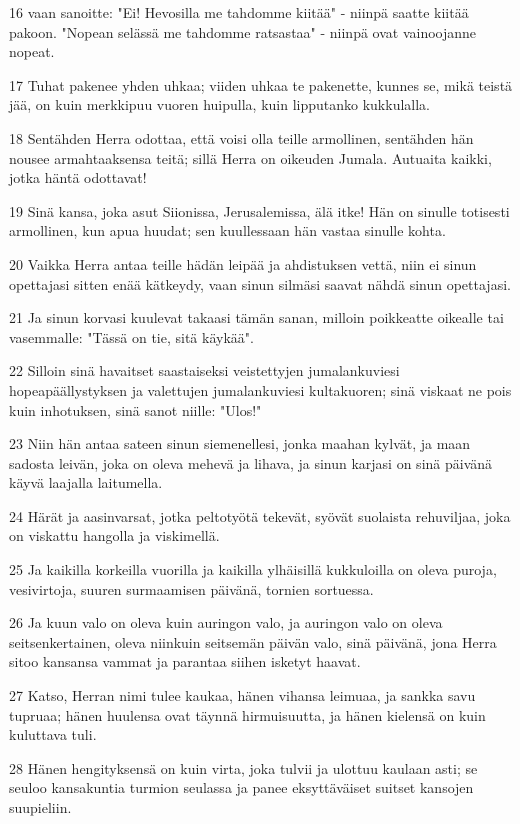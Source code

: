 \par 16 vaan sanoitte: "Ei! Hevosilla me tahdomme kiitää" - niinpä saatte kiitää pakoon. "Nopean selässä me tahdomme ratsastaa" - niinpä ovat vainoojanne nopeat.
\par 17 Tuhat pakenee yhden uhkaa; viiden uhkaa te pakenette, kunnes se, mikä teistä jää, on kuin merkkipuu vuoren huipulla, kuin lipputanko kukkulalla.
\par 18 Sentähden Herra odottaa, että voisi olla teille armollinen, sentähden hän nousee armahtaaksensa teitä; sillä Herra on oikeuden Jumala. Autuaita kaikki, jotka häntä odottavat!
\par 19 Sinä kansa, joka asut Siionissa, Jerusalemissa, älä itke! Hän on sinulle totisesti armollinen, kun apua huudat; sen kuullessaan hän vastaa sinulle kohta.
\par 20 Vaikka Herra antaa teille hädän leipää ja ahdistuksen vettä, niin ei sinun opettajasi sitten enää kätkeydy, vaan sinun silmäsi saavat nähdä sinun opettajasi.
\par 21 Ja sinun korvasi kuulevat takaasi tämän sanan, milloin poikkeatte oikealle tai vasemmalle: "Tässä on tie, sitä käykää".
\par 22 Silloin sinä havaitset saastaiseksi veistettyjen jumalankuviesi hopeapäällystyksen ja valettujen jumalankuviesi kultakuoren; sinä viskaat ne pois kuin inhotuksen, sinä sanot niille: "Ulos!"
\par 23 Niin hän antaa sateen sinun siemenellesi, jonka maahan kylvät, ja maan sadosta leivän, joka on oleva mehevä ja lihava, ja sinun karjasi on sinä päivänä käyvä laajalla laitumella.
\par 24 Härät ja aasinvarsat, jotka peltotyötä tekevät, syövät suolaista rehuviljaa, joka on viskattu hangolla ja viskimellä.
\par 25 Ja kaikilla korkeilla vuorilla ja kaikilla ylhäisillä kukkuloilla on oleva puroja, vesivirtoja, suuren surmaamisen päivänä, tornien sortuessa.
\par 26 Ja kuun valo on oleva kuin auringon valo, ja auringon valo on oleva seitsenkertainen, oleva niinkuin seitsemän päivän valo, sinä päivänä, jona Herra sitoo kansansa vammat ja parantaa siihen isketyt haavat.
\par 27 Katso, Herran nimi tulee kaukaa, hänen vihansa leimuaa, ja sankka savu tupruaa; hänen huulensa ovat täynnä hirmuisuutta, ja hänen kielensä on kuin kuluttava tuli.
\par 28 Hänen hengityksensä on kuin virta, joka tulvii ja ulottuu kaulaan asti; se seuloo kansakuntia turmion seulassa ja panee eksyttäväiset suitset kansojen suupieliin.
